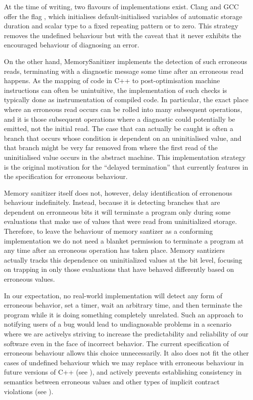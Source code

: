 At the time of writing, two flavours of \cite{P2795R5} implementations exist. Clang and GCC offer the flag \mbox{}, which initialises default-initialised variables of automatic storage duration and scalar type to a fixed repeating pattern or to zero. This strategy removes the undefined behaviour but with the caveat that it never exhibits the encouraged behaviour of diagnosing an error.

On the other hand, MemorySanitizer implements the detection of such erroneous reads, terminating with a diagnostic message some time after an erroneous read happens.
As the mapping of code in C++ to  post-optimisation machine instructions can often be unintuitive, the implementation  of such checks is typically done as instrumentation of compiled code.  In particular, the exact place where an erroneous read occurs can be rolled into many subsequent operations, and it is those subsequent operations where a diagnostic could potentially be emitted, not the initial read.  The case that can actually be caught is often a branch that occurs whose condition is dependent on an uninitialised value, and that branch might be very far removed from where the first read of the uninitialised value occurs in the abstract machine. This implementation strategy is the original motivation for the ``delayed termination'' that currently features in the specification for erroneous behaviour.

Memory sanitizer itself does not, however, delay identification of erronenous behaviour indefinitely.  Instead, because it is detecting branches that are dependent on erronneous bits it will terminate a program only during some evaluations that make use of values that were read from uninitialized storage.   Therefore, to leave the behaviour of memory santizer as a conforming implementation we do not need a blanket permission to terminate a program at any time after an erroneous operation has taken place.  Memory santiziers actually tracks this dependence on uninitialized values at the bit level, focusing on trapping in only those evaluations that have behaved differently based on erroneous values.

In our expectation, no real-world implementation will detect any form of erroneous behavior, set a timer, wait an arbitrary time, and then terminate the program while it is doing something completely unrelated.  Such an approach to notifying users of a bug would lead to undiagnosable problems in a scenario where we are activelys striving to increase the predictability and reliability of our software even in the face of incorrect behavior.   The current specification of erroneous behaviour allows this choice unnecessarily. It also does not fit the other cases of undefined behaviour which we may replace with erroneous behaviour in future versions of C++ (see \cite{P3100R4}), and actively prevents establishing consistency in semantics between erroneous values and other types of implicit contract violations (see \cite{P3229R0}).

